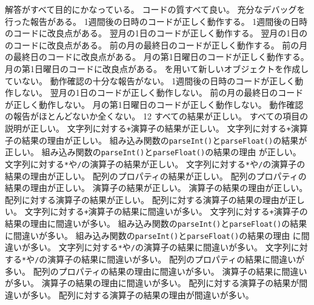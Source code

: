 {	{
  {解答がすべて目的にかなっている。}
  {コードの質すべて良い。}
  {充分なデバッグを行った報告がある。}
  }
	{
  {1週間後の日時のコードが正しく動作する。}
  {1週間後の日時のコードに改良点がある。}
  {翌月の1日のコードが正しく動作する。}
  {翌月の1日ののコードに改良点がある。}
  {前の月の最終日のコードが正しく動作する。}
  {前の月の最終日のコードに改良点がある。}
  {月の第1日曜日のコードが正しく動作する。}
  {月の第1日曜日のコードに改良点がある。}
	{を用いて新しいオブジェクトを作成していない。}
  {動作確認の十分な報告がない。}
	}
	{
  {1週間後の日時のコードが正しく動作しない。}
  {翌月の1日のコードが正しく動作しない。}
  {前の月の最終日のコードが正しく動作しない。}
  {月の第1日曜日のコードが正しく動作しない。}
  {動作確認の報告がほとんどないか全くない。}
	}
	{}{12}
	{
	{すべての結果が正しい。}
	{すべての項目の説明が正しい。}
  }
	{
	{文字列に対する\texttt{+}演算子の結果が正しい。}
	{文字列に対する\texttt{+}演算子の結果の理由が正しい。}
	{組み込み関数の\texttt{parseInt()}と\texttt{parseFloat()}の結果が正しい。}
	{組み込み関数の\texttt{parseInt()}と\texttt{parseFloat()}の結果の理由
	が正しい。}
	{文字列に対する\texttt{*}や\texttt{/}の演算子の結果が正しい。}
	{文字列に対する\texttt{*}や\texttt{/}の演算子の結果の理由が正しい。}
	{配列のプロパティの結果が正しい。}
	{配列のプロパティの結果の理由が正しい。}
	{\ElmJ{==}演算子の結果が正しい。}
	{\ElmJ{==}演算子の結果の理由が正しい。}
	{配列に対する\ElmJ{==}演算子の結果が正しい。}
	{配列に対する\ElmJ{==}演算子の結果の理由が正しい。}
	}
	{
	{文字列に対する\texttt{+}演算子の結果に間違いが多い。}
	{文字列に対する\texttt{+}演算子の結果の理由に間違いが多い。}
	{組み込み関数の\texttt{parseInt()}と\texttt{parseFloat()}の結果に間違いが多い。}
	{組み込み関数の\texttt{parseInt()}と\texttt{parseFloat()}の結果の理由
	に間違いが多い。}
	{文字列に対する\texttt{*}や\texttt{/}の演算子の結果に間違いが多い。}
	{文字列に対する\texttt{*}や\texttt{/}の演算子の結果に間違いが多い。}
	{配列のプロパティの結果に間違いが多い。}
	{配列のプロパティの結果の理由に間違いが多い。}
	{\ElmJ{==}演算子の結果に間違いが多い。}
	{\ElmJ{==}演算子の結果の理由に間違いが多い。}
	{配列に対する\ElmJ{==}演算子の結果が間違いが多い。}
	{配列に対する\ElmJ{==}演算子の結果の理由が間違いが多い。}
	}
}
